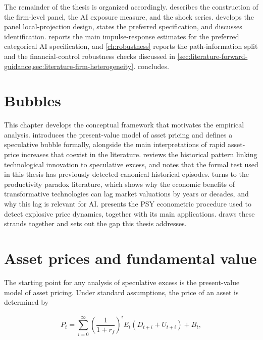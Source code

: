 The remainder of the thesis is organized accordingly.
 describes the construction of the firm-level panel,
the AI exposure measure, and the shock series.
 develops the panel local-projection design,
states the preferred specification, and discusses identification.
 reports the main impulse-response estimates for the
preferred categorical AI specification, and \cref{ch:robustness}
reports the path-information split and the financial-control
robustness checks discussed in
\cref{sec:literature-forward-guidance,sec:literature-firm-heterogeneity}.
 concludes.


\section{Bubbles}

This chapter develops the conceptual framework that motivates the empirical analysis.  introduces the present-value model of asset pricing and defines a speculative bubble formally, alongside the main interpretations of rapid asset-price increases that coexist in the literature.  reviews the historical pattern linking technological innovation to speculative excess, and notes that the formal test used in this thesis has previously detected canonical historical episodes.  turns to the productivity paradox literature, which shows why the economic benefits of transformative technologies can lag market valuations by years or decades, and why this lag is relevant for AI.  presents the PSY econometric procedure used to detect explosive price dynamics, together with its main applications.  draws these strands together and sets out the gap this thesis addresses.

\section{Asset prices and fundamental value}
\label{sec:asset-prices-fundamental-value}

The starting point for any analysis of speculative excess is the present-value model of asset pricing. Under standard assumptions, the price of an asset is determined by

\begin{equation}
P_t = \sum_{i=0}^{\infty} \left( \frac{1}{1+r_f} \right)^i E_t \left( D_{t+i} + U_{t+i} \right) + B_t,
\label{eq:present-value-bubble}
\end{equation}


